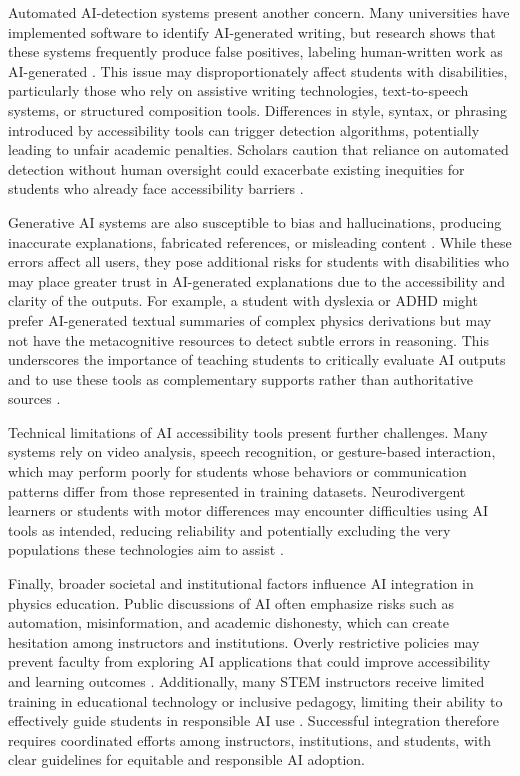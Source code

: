 \documentclass[]{aastex701}
\begin{document}
Automated AI-detection systems present another concern. Many universities have implemented software to identify AI-generated writing, but research shows that these systems frequently produce false positives, labeling human-written work as AI-generated \autocite{Voultsiou2025, HarkinsBrown2025}. This issue may disproportionately affect students with disabilities, particularly those who rely on assistive writing technologies, text-to-speech systems, or structured composition tools. Differences in style, syntax, or phrasing introduced by accessibility tools can trigger detection algorithms, potentially leading to unfair academic penalties. Scholars caution that reliance on automated detection without human oversight could exacerbate existing inequities for students who already face accessibility barriers \autocite{Voultsiou2025, HarkinsBrown2025}.

Generative AI systems are also susceptible to bias and hallucinations, producing inaccurate explanations, fabricated references, or misleading content \autocite{Paglialunga2025, Voultsiou2025, Weijers2025}. While these errors affect all users, they pose additional risks for students with disabilities who may place greater trust in AI-generated explanations due to the accessibility and clarity of the outputs. For example, a student with dyslexia or ADHD might prefer AI-generated textual summaries of complex physics derivations but may not have the metacognitive resources to detect subtle errors in reasoning. This underscores the importance of teaching students to critically evaluate AI outputs and to use these tools as complementary supports rather than authoritative sources \autocite{Paglialunga2025, Voultsiou2025, Weijers2025}.

Technical limitations of AI accessibility tools present further challenges. Many systems rely on video analysis, speech recognition, or gesture-based interaction, which may perform poorly for students whose behaviors or communication patterns differ from those represented in training datasets. Neurodivergent learners or students with motor differences may encounter difficulties using AI tools as intended, reducing reliability and potentially excluding the very populations these technologies aim to assist \autocite{Voultsiou2025, HarkinsBrown2025}.

Finally, broader societal and institutional factors influence AI integration in physics education. Public discussions of AI often emphasize risks such as automation, misinformation, and academic dishonesty, which can create hesitation among instructors and institutions. Overly restrictive policies may prevent faculty from exploring AI applications that could improve accessibility and learning outcomes \autocite{Liang2026}. Additionally, many STEM instructors receive limited training in educational technology or inclusive pedagogy, limiting their ability to effectively guide students in responsible AI use \autocite{Almufareh2025, Voultsiou2025}. Successful integration therefore requires coordinated efforts among instructors, institutions, and students, with clear guidelines for equitable and responsible AI adoption.
\end{document}
